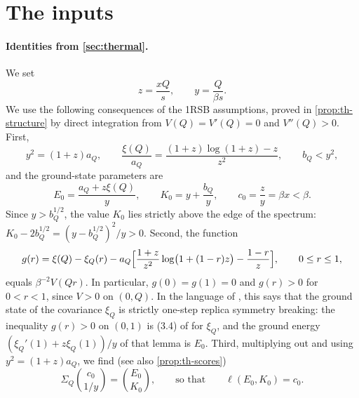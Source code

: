 \section{The inputs}\label{sec:mo-inputs}

\paragraph{Identities from \cref{sec:thermal}.}
We set
\begin{equation}\label{eq:mo-zy}
z=\frac{xQ}{s},\qquad y=\frac{Q}{\beta s}.
\end{equation}
We use the following consequences of the 1RSB assumptions, proved in \cref{prop:th-structure} by direct integration from $V(Q)=V'(Q)=0$ and $V''(Q)>0$. First,
\begin{equation}\label{eq:mo-thermal}
y^2=(1+z)a_Q,\qquad \frac{\xi(Q)}{a_Q}=\frac{(1+z)\log(1+z)-z}{z^2},\qquad b_Q<y^2,
\end{equation}
and the ground-state parameters are
\begin{equation}\label{eq:mo-marks}
E_0=\frac{a_Q+z\xi(Q)}{y},\qquad K_0=y+\frac{b_Q}{y},\qquad c_0=\frac zy=\beta x<\beta.
\end{equation}
Since $y>b_Q^{1/2}$, the value $K_0$ lies strictly above the edge of the spectrum: $K_0-2b_Q^{1/2}=(y-b_Q^{1/2})^2/y>0$. Second, the function
\begin{equation}\label{eq:mo-g}
g(r)=\xi(Q)-\xi_Q(r)-a_Q\Bigl[\frac{1+z}{z^2}\log\bigl(1+(1-r)z\bigr)-\frac{1-r}{z}\Bigr],\qquad0\le r\le1,
\end{equation}
equals $\beta^{-2}V(Qr)$. In particular, $g(0)=g(1)=0$ and $g(r)>0$ for $0<r<1$, since $V>0$ on $(0,Q)$. In the language of \cite{HuangSellke2024}, this says that the ground state of the covariance $\xi_Q$ is strictly one-step replica symmetry breaking: the inequality $g(r)>0$ on $(0,1)$ is (3.4) of \cite[Lemma~3.5]{HuangSellke2024} for $\xi_Q$, and the ground energy $(\xi_Q'(1)+z\xi_Q(1))/y$ of that lemma is $E_0$. Third, multiplying out and using $y^2=(1+z)a_Q$, we find (see also \cref{prop:th-scores})
\begin{equation}\label{eq:mo-score}
\Sigma_Q\binom{c_0}{1/y}=\binom{E_0}{K_0},\qquad\text{so that}\qquad \ell(E_0,K_0)=c_0.
\end{equation}

